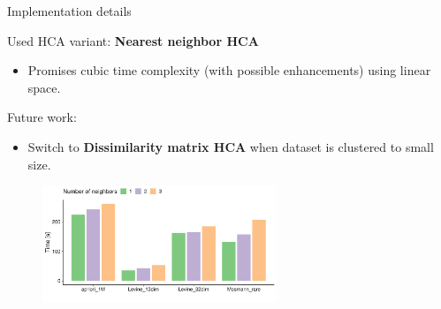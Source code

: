 \documentclass[10pt]{beamer}
\begin{document}
\begin{frame}{Implementation details}
	
	Used HCA variant: \textbf{Nearest neighbor HCA}
	\begin{itemize}
		\item Promises cubic time complexity (with possible enhancements) using linear space.
	\end{itemize}
	
	Future work:
	\begin{itemize}
		\item Switch to \textbf{Dissimilarity matrix HCA} when dataset is clustered to small size.
	\end{itemize}


	\begin{figure}
		\includegraphics[width=7cm]{../img/neighbor_compare}
	\end{figure}
	
\end{frame}
\end{document}
